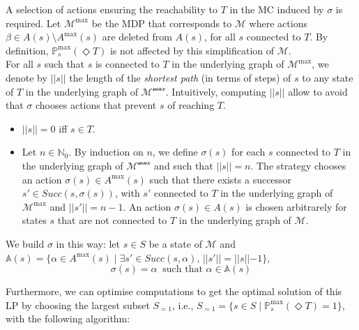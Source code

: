 A selection of actions ensuring
the reachability to $T$ in the
MC induced by $\sigma$ is required.
Let $\mathcal{M}^{\max}$ be the MDP that corresponds to $\mathcal{M}$
where actions $\beta \in A(s) \setminus A^{\max}(s)$ are deleted from $A(s)$,
for all $s$ connected to $T$.
By definition, $\mathbb{P}^{\max}_s(\Diamond T)$ is not affected by this simplification of
$\mathcal{M}$. \\

For all $s$ such that $s$ is connected to $T$ in the underlying graph of
$\mathcal{M}^{\max}$, we denote by $||s||$ the length of the \textit{shortest path} (in terms of steps) of $s$ to any state of $T$ in the underlying graph of
$\mathcal{M^{\max}}$. Intuitively, computing $||s||$ allow to avoid that $\sigma$ chooses
actions that prevent $s$ of reaching $T$.
\begin{itemize}
	\renewcommand{\labelitemi}{\tiny$\bullet$}
	\item $||s|| = 0$ iff $s \in T$.
	\item Let $n \in \mathbb{N}_0$. By induction on $n$, we define
		$\sigma(s)$ for each $s$ connected to $T$ in the underlying graph of
		$\mathcal{M^{\max}}$ and such that $||s|| = n$.
		The strategy chooses an action $\sigma(s) \in A^{\max}(s)$ such that there exists a successor $s' \in Succ(s, \sigma(s))$, with $s'$ connected to $T$ in the underlying graph of
		$\mathcal{M}^{\max}$ and $||s'|| = n - 1$. An action $\sigma(s) \in A(s)$ is chosen
		arbitrarely for states $s$ that are not connected to $T$ in the underlying graph of $\mathcal{M}$.
\end{itemize}
We build $\sigma$ in this way: let $s \in S$ be a state of $\mathcal{M}$ and $\mathbb{A}(s) = \{\alpha \in A^{\max}(s) \; | \; \exists s' \in Succ(s,
	\alpha), \, ||s'|| = ||s|| - 1 \}$,
\[
	\sigma(s) = \alpha \;\; \text{such that } \alpha \in \mathbb{A}(s)
\]

Furthermore, we can optimise computations to get the optimal solution of this LP by choosing the largest subset $S_{=1}$, i.e., $S_{=1}=\{s\in S \; | \; \mathbb{P}^{\max}_s(\Diamond T) = 1\}$, with the following algorithm:

